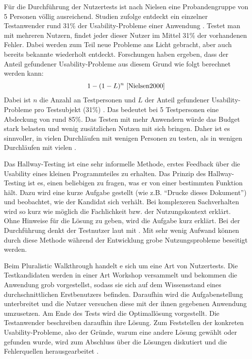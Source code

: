 Für die Durchführung der Nutzertests ist nach Nielsen eine Probandengruppe von 5 Personen völlig ausreichend. Studien zufolge entdeckt ein einzelner Testanwender rund 31\% der Usability-Probleme einer Anwendung \cite{Nielsen2000}. Testet man mit mehreren Nutzern, findet jeder dieser Nutzer im Mittel 31\% der vorhandenen Fehler. Dabei werden zum Teil neue Probleme ans Licht gebracht, aber auch bereits bekannte wiederholt entdeckt. Forschungen haben ergeben, dass der Anteil gefundener Usability-Probleme aus diesem Grund wie folgt berechnet werden kann:
\begin{equation}
			1-(1-L)^n\text{ \cite{Nielsen2000}}
\end{equation}
Dabei ist \(n\) die Anzahl an Testpersonen und \(L\) der Anteil gefundener Usability-Probleme pro Testsubjekt (31\%) \cite{Nielsen2000}. Das bedeutet bei 5 Testpersonen eine Abdeckung von rund 85\%. Das Testen mit mehr Anwendern würde das Budget stark belasten und wenig zusätzlichen Nutzen mit sich bringen. Daher ist es sinnvoller, in vielen Durchläufen mit wenigen Personen zu testen, als in wenigen Durchläufen mit vielen \cite{Nielsen2000}.\par
{}
Das Hallway-Testing ist eine sehr informelle Methode, erstes Feedback über die Usability eines kleinen Programmteiles zu erhalten. Das Prinzip des Hallway-Testing ist es, einen beliebigen zu fragen, was er von einer bestimmten Funktion hält. Dazu wird eine kurze Aufgabe gestellt (wie z.B. \enquote{Drucke dieses Dokument}) und beobachtet, wie der Kandidat sich verhält. Bei komplexeren Sachverhalten wird so kurz wie möglich die Fachlichkeit bzw. der Nutzungskontext erklärt. Ohne Hinweise für die Lösung zu geben, wird die Aufgabe kurz erklärt. Bei der Durchführung denkt der Testnutzer laut mit \cite[S. 226]{Ullenboom2014}.
Mit sehr wenig Aufwand können durch diese Methode während der Entwicklung grobe Nutzungsprobleme beseitigt werden.\par
{}
Beim Pluralistic Walkthrough handelt e sich um eine Art von Nutzertests. Die Testkandidaten werden in einer Art Workshop versammelt und bekommen die Anwendung grob vorgestellst, sodass sie sich auf dem Wissensstand eines durchschnittlichen Erstbenutzers befinden. Daraufhin wird die Aufgabenstellung unterbreitet und die Nutzer versuchen diese mit der ihnen gegebenen Anwendung umzusetzen. Am Ende des Tests wird die Optimallösung vorgestellt. Die Testanwender beschreiben daraufhin ihre Lösung. Zum Feststellen der konkreten Usability-Probleme, also der Gründe, warum eine andere Lösung gewählt oder gefunden wurde, wird zum Abschluss über die Lösungen diskutiert und die Fehlerquellen herausgearbeitet \cite[S. 228]{Ullenboom2014}.\par

